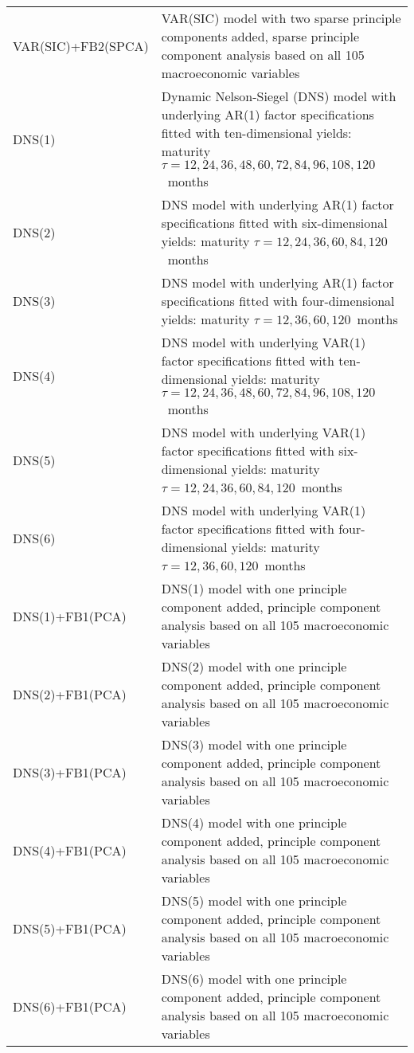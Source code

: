 \begin{footnotesize}
\begin{tabularx}{\linewidth}{lX}
VAR(SIC)+FB2(SPCA)        & VAR(SIC) model with two sparse principle components added, sparse principle component analysis based on all 105 macroeconomic variables \\
DNS(1)                    & Dynamic Nelson-Siegel (DNS) model with underlying AR(1) factor specifications fitted with ten-dimensional yields: maturity $\tau = 12, 24, 36, 48, 60, 72, 84, 96, 108, 120$\ months \\
DNS(2)                    & DNS model with underlying AR(1) factor specifications fitted with six-dimensional yields: maturity $\tau = 12, 24, 36, 60, 84, 120$\ months  \\
DNS(3)                    & DNS model with underlying AR(1) factor specifications fitted with four-dimensional yields: maturity $\tau = 12, 36, 60, 120$\ months         \\
DNS(4)                    & DNS model with underlying VAR(1) factor specifications fitted with ten-dimensional yields: maturity $\tau = 12, 24, 36, 48, 60, 72, 84, 96, 108, 120$\ months \\
DNS(5)                    & DNS model with underlying VAR(1) factor specifications fitted with six-dimensional yields: maturity $\tau = 12, 24, 36, 60, 84, 120$\ months \\
DNS(6)                    & DNS model with underlying VAR(1) factor specifications fitted with four-dimensional yields: maturity $\tau = 12, 36, 60, 120$\ months        \\ 
DNS(1)+FB1(PCA)           & DNS(1) model with one principle component added, principle component analysis based on all 105 macroeconomic variables \\
DNS(2)+FB1(PCA)           & DNS(2) model with one principle component added, principle component analysis based on all 105 macroeconomic variables \\
DNS(3)+FB1(PCA)           & DNS(3) model with one principle component added, principle component analysis based on all 105 macroeconomic variables \\
DNS(4)+FB1(PCA)           & DNS(4) model with one principle component added, principle component analysis based on all 105 macroeconomic variables \\
DNS(5)+FB1(PCA)           & DNS(5) model with one principle component added, principle component analysis based on all 105 macroeconomic variables \\
DNS(6)+FB1(PCA)           & DNS(6) model with one principle component added, principle component analysis based on all 105 macroeconomic variables \\

\end{tabularx}
\end{footnotesize}
